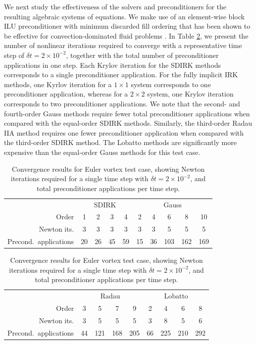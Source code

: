 \documentclass[review]{siamart}
\begin{document}
We next study the effectiveness of the solvers and preconditioners for the
resulting algebraic systems of equations. We make use of an element-wise block
ILU preconditioner with minimum discarded fill ordering that has been shown to
be effective for convection-dominated fluid problems \cite{Persson2008}. In
Table \ref{tab:ev-solvers}, we present the number of nonlinear iterations
required to converge with a representative time step of $\delta t = 2 \times
10^{-2}$, together with the total number of preconditioner applications in one
step. Each Krylov iteration for the SDIRK methods corresponds to a single
preconditioner application. For the fully implicit IRK methods, one Kyrlov
iteration for a $1\times1$ system corresponds to one preconditioner application,
whereas for a $2\times2$ system, one Krylov iteration corresponds to two
preconditioner applications. We note that the second- and fourth-order Gauss
methods require fewer total preconditioner applications when compared with the
equal-order SDIRK methods. Similarly, the third-order Radau IIA method requires
one fewer preconditioner application when compared with the third-order SDIRK
method. The Lobatto methods are significantly more expensive than the
equal-order Gauss methods for this test case.

\begin{table}
	\centering
	\caption{Convergence results for Euler vortex test case, showing Newton iterations required for a single time step with $\delta t = 2\times10^{-2}$, and total preconditioner applications per time step.
	}
	\label{tab:ev-solvers}
	\begin{tabular}{r|cccc|ccccc}
		\toprule
		& \multicolumn{4}{c|}{SDIRK} & \multicolumn{5}{c}{Gauss} \\
		Order  & 1 & 2 & 3 & 4 & 2 & 4 & 6 & 8 & 10\\
		\midrule
		Newton its. & 3 & 3 & 3 & 3 & 3 & 3 & 5 & 5 & 5\\
		\midrule
		Precond.\ applications & 20 & 26 & 45 & 59 & 15 & 36 & 103 & 162 & 169\\
		\bottomrule
	\end{tabular}

	\vspace{\floatsep}

	\begin{tabular}{r|cccc|cccc}
		\toprule
		& \multicolumn{4}{c|}{Radau} & \multicolumn{4}{c}{Lobatto} \\
		Order  & 3 & 5 & 7 & 9 & 2 & 4 & 6 & 8\\
		\midrule
		Newton its. & 3 & 5 & 5 & 5 & 3 & 8 & 5 & 6\\
		\midrule
		Precond.\ applications & 44 & 121 & 168 & 205 & 66 & 225 & 210 & 292\\
		\bottomrule
	\end{tabular}
\end{table}
\end{document}

